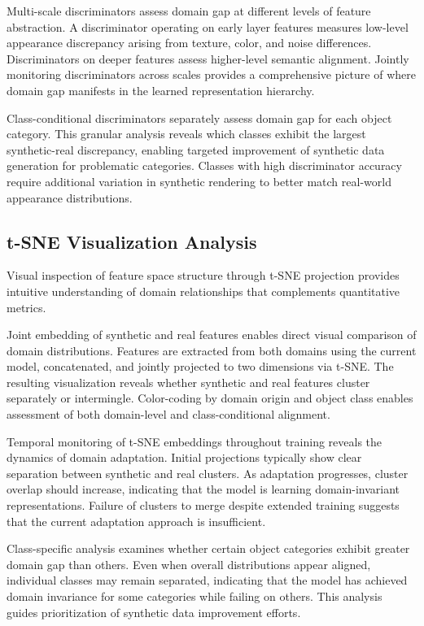 Multi-scale discriminators assess domain gap at different levels of feature abstraction. A discriminator operating on early layer features measures low-level appearance discrepancy arising from texture, color, and noise differences. Discriminators on deeper features assess higher-level semantic alignment. Jointly monitoring discriminators across scales provides a comprehensive picture of where domain gap manifests in the learned representation hierarchy.

Class-conditional discriminators separately assess domain gap for each object category. This granular analysis reveals which classes exhibit the largest synthetic-real discrepancy, enabling targeted improvement of synthetic data generation for problematic categories. Classes with high discriminator accuracy require additional variation in synthetic rendering to better match real-world appearance distributions.

\subsection{t-SNE Visualization Analysis}

Visual inspection of feature space structure through t-SNE projection provides intuitive understanding of domain relationships that complements quantitative metrics.

Joint embedding of synthetic and real features enables direct visual comparison of domain distributions. Features are extracted from both domains using the current model, concatenated, and jointly projected to two dimensions via t-SNE. The resulting visualization reveals whether synthetic and real features cluster separately or intermingle. Color-coding by domain origin and object class enables assessment of both domain-level and class-conditional alignment.

Temporal monitoring of t-SNE embeddings throughout training reveals the dynamics of domain adaptation. Initial projections typically show clear separation between synthetic and real clusters. As adaptation progresses, cluster overlap should increase, indicating that the model is learning domain-invariant representations. Failure of clusters to merge despite extended training suggests that the current adaptation approach is insufficient.

Class-specific analysis examines whether certain object categories exhibit greater domain gap than others. Even when overall distributions appear aligned, individual classes may remain separated, indicating that the model has achieved domain invariance for some categories while failing on others. This analysis guides prioritization of synthetic data improvement efforts.

